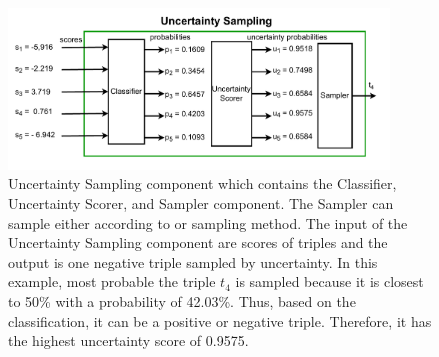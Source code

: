 \begin{figure}[H]
  \centering
    \includegraphics[width=0.90\textwidth]{figures/uncertainty_sampling_component.pdf}
  \caption{Uncertainty Sampling component which contains the Classifier,  Uncertainty Scorer, and  Sampler component. 
  The Sampler can sample either according to \usmax or \ussoftmax sampling method. 
  The input of the Uncertainty Sampling component are scores of triples and the output is one negative triple sampled by uncertainty.
  In this example, most probable the triple $t_4$ is sampled because it is closest to 50\% with a probability of 42.03\%.
  Thus, based on the classification, it can be a positive or negative triple.
  Therefore, it has the highest uncertainty score of 0.9575.}
  \label{fig:uncertainty_sampling_component}
\end{figure}